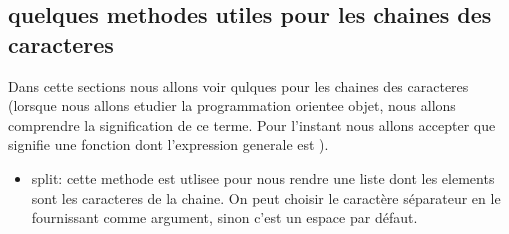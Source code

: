 \documentclass[letterpaper,10pt,french]{sphinxmanual}
\begin{document}
\subsection{quelques methodes utiles pour les chaines des caracteres}
\label{\detokenize{ch3:quelques-methodes-utiles-pour-les-chaines-des-caracteres}}
\sphinxAtStartPar
Dans cette sections nous allons voir qulques   pour les chaines des caracteres (lorsque nous allons etudier la programmation orientee objet, nous allons comprendre la signification de ce terme. Pour l’instant nous allons accepter que  signifie une fonction dont l’expression generale est ).
\begin{itemize}
\item {} 
\sphinxAtStartPar
split: cette methode est utlisee pour nous rendre une liste dont les elements sont les caracteres de la chaine.  On peut choisir le caractère séparateur en le fournissant comme argument, sinon c’est un espace par défaut.

\end{itemize}

\begin{sphinxVerbatim}[commandchars=\\\{\}]
  

  

  
\end{sphinxVerbatim}
\end{document}
